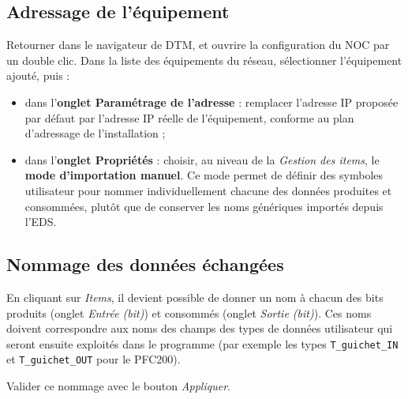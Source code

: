 \subsection{Adressage de l'équipement}

Retourner dans le navigateur de DTM, et ouvrire la configuration du NOC par un double clic. 
Dans la liste des équipements du réseau, sélectionner l'équipement ajouté,
puis :

\begin{itemize}
    \item dans l'\textbf{onglet Paramétrage de l'adresse} : remplacer
    l'adresse IP proposée par défaut par l'adresse IP réelle de
    l'équipement, conforme au plan d'adressage de l'installation ;
    \item dans l'\textbf{onglet Propriétés} : choisir, au niveau de la
    \emph{Gestion des items}, le \textbf{mode d'importation manuel}. Ce
    mode permet de définir des symboles utilisateur pour nommer
    individuellement chacune des données produites et consommées, plutôt
    que de conserver les noms génériques importés depuis l'EDS.
\end{itemize}

\subsection{Nommage des données échangées}

En cliquant sur \emph{Items}, il devient possible de donner un nom à
chacun des bits produits (onglet \emph{Entrée (bit)}) et consommés (onglet
\emph{Sortie (bit)}). Ces noms doivent correspondre aux noms des champs des
types de données utilisateur qui seront ensuite exploités dans le programme
(par exemple les types \texttt{T\_guichet\_IN} et \texttt{T\_guichet\_OUT}
pour le PFC200).


Valider ce nommage avec le bouton \emph{Appliquer}.
